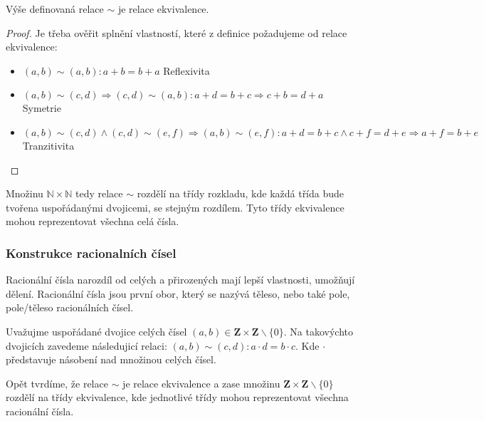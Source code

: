 \begin{theorem}
	Výše definovaná relace $\sim$ je relace ekvivalence.
\end{theorem}
\begin{proof}
	Je třeba ověřit splnění vlastností, které z definice požadujeme od relace ekvivalence:
	\begin{itemize}
		\item $(a, b) \sim (a, b): a + b = b + a$ \hfill Reflexivita
		\item  $(a, b) \sim (c, d) \Rightarrow (c, d) \sim (a, b): a + d = b +
		c \Rightarrow c + b = d + a$ \hfill Symetrie
		\item $(a, b) \sim (c, d) \wedge (c, d) \sim (e, f) \Rightarrow (a, b) \sim (e, f):
		a + d = b + c \wedge c + f = d + e \Rightarrow a + f = b + e$ \hfill Tranzitivita
	\end{itemize}
\end{proof}

Množinu $\mathbb{N} \times \mathbb{N}$ tedy relace $\sim$ rozdělí na třídy rozkladu, kde každá třída
bude tvořena uspořádanými dvojicemi, se stejným rozdílem. Tyto třídy ekvivalence mohou reprezentovat
všechna celá čísla.

\subsubsection*{Konstrukce racionalních čísel}
Racionální čísla narozdíl od celých a přirozených mají lepší vlastnosti, umožňují dělení.
Racionální čísla jsou první obor, který se nazývá těleso, nebo také pole, pole/těleso racionálních
čísel.

Uvažujme uspořádané dvojice celých čísel
$(a, b) \in \mathbf{Z} \times \mathbf{Z} \smallsetminus \{0\}$.
Na takovýchto dvojicích zavedeme následujicí relaci: $(a, b) \sim (c, d): a \cdot d=b \cdot c$.
Kde $\cdot$ představuje násobení nad množinou celých čísel.

Opět tvrdíme, že relace $\sim$ je relace ekvivalence a zase množinu
$\mathbf{Z} \times \mathbf{Z} \smallsetminus \{0\}$ rozdělí na třídy ekvivalence, kde jednotlivé
třídy mohou reprezentovat všechna racionální čísla.